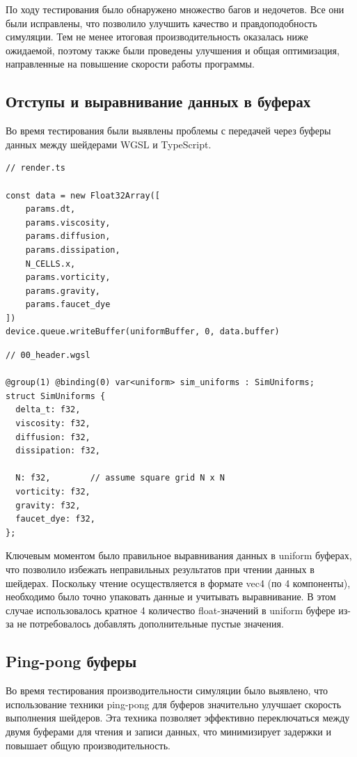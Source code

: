 По ходу тестирования было обнаружено множество багов и недочетов. Все они были исправлены, что позволило улучшить качество и правдоподобность симуляции. Тем не менее итоговая производительность оказалась ниже ожидаемой, поэтому также были проведены улучшения и общая оптимизация, направленные на повышение скорости работы программы.

\subsection{Отступы и выравнивание данных в буферах}

Во время тестирования были выявлены проблемы с передачей через буферы данных между шейдерами WGSL и TypeScript.

\begin{lstlisting}[language=ES6, caption=Пример передачи динамических параметров из CPU на GPU]
// render.ts

const data = new Float32Array([
    params.dt,
    params.viscosity,
    params.diffusion,
    params.dissipation,
    N_CELLS.x,
    params.vorticity,
    params.gravity,
    params.faucet_dye
])
device.queue.writeBuffer(uniformBuffer, 0, data.buffer)
\end{lstlisting}

\begin{lstlisting}[caption=Пример получения динамических параметров в шейдере]
// 00_header.wgsl

@group(1) @binding(0) var<uniform> sim_uniforms : SimUniforms;
struct SimUniforms {
  delta_t: f32,
  viscosity: f32,
  diffusion: f32,
  dissipation: f32,

  N: f32,        // assume square grid N x N
  vorticity: f32,
  gravity: f32,
  faucet_dye: f32,
};
\end{lstlisting}

Ключевым моментом было правильное выравнивания данных в uniform буферах, что позволило избежать неправильных результатов при чтении данных в шейдерах. Поскольку чтение осуществляется в формате vec4 (по 4 компоненты), необходимо было точно упаковать данные и учитывать выравнивание. В этом случае использовалось кратное 4 количество float-значений в uniform буфере из-за не потребовалось добавлять дополнительные пустые значения.

\subsection{Ping-pong буферы}

Во время тестирования производительности симуляции было выявлено, что использование техники ping-pong для буферов значительно улучшает скорость выполнения шейдеров. Эта техника позволяет эффективно переключаться между двумя буферами для чтения и записи данных, что минимизирует задержки и повышает общую производительность.

